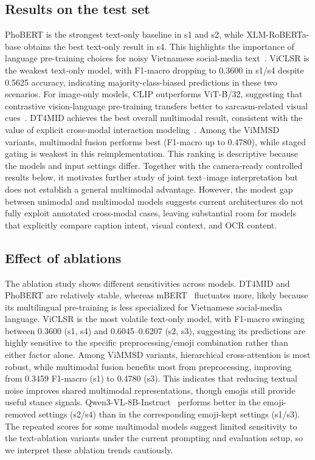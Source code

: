 \documentclass[conference]{IEEEtran}
\begin{document}
\subsection{Results on the test set}
PhoBERT is the strongest text-only baseline in s1 and s2, while XLM-RoBERTa-base obtains the best text-only result in s4. This highlights the importance of language pre-training choices for noisy Vietnamese social-media text~\cite{nguyen-tuan-nguyen-2020-phobert}. ViCLSR is the weakest text-only model, with F1-macro dropping to 0.3600 in s1/s4 despite 0.5625 accuracy, indicating majority-class-biased predictions in these two scenarios. For image-only models, CLIP outperforms ViT-B/32, suggesting that contrastive vision-language pre-training transfers better to sarcasm-related visual cues~\cite{radford_learning_2021}. DT4MID achieves the best overall multimodal result, consistent with the value of explicit cross-modal interaction modeling~\cite{tomas_transformer-based_2023}.
Among the ViMMSD variants, multimodal fusion performs best (F1-macro up to 0.4780), while staged gating is weakest in this reimplementation. This ranking is descriptive because the models and input settings differ. Together with the camera-ready controlled results below, it motivates further study of joint text--image interpretation but does not establish a general multimodal advantage.
However, the modest gap between unimodal and multimodal models suggests current architectures do not fully exploit annotated cross-modal cases, leaving substantial room for models that explicitly compare caption intent, visual context, and OCR content.
\subsection{Effect of ablations}
\label{sec:text-ablation}
The ablation study shows different sensitivities across models. DT4MID and PhoBERT are relatively stable, whereas mBERT~\cite{pires_how_2019} fluctuates more, likely because its multilingual pre-training is less specialized for Vietnamese social-media language. ViCLSR is the most volatile text-only model, with F1-macro swinging between 0.3600 (s1, s4) and 0.6045--0.6207 (s2, s3), suggesting its predictions are highly sensitive to the specific preprocessing/emoji combination rather than either factor alone. Among ViMMSD variants, hierarchical cross-attention is most robust, while multimodal fusion benefits most from preprocessing, improving from 0.3459 F1-macro (s1) to 0.4780 (s3). This indicates that reducing textual noise improves shared multimodal representations, though emojis still provide useful stance signals. Qwen3-VL-8B-Instruct~\cite{bai_qwen3-vl_2025} performs better in the emoji-removed settings (s2/s4) than in the corresponding emoji-kept settings (s1/s3). The repeated scores for some multimodal models suggest limited sensitivity to the text-ablation variants under the current prompting and evaluation setup, so we interpret these ablation trends cautiously.
\end{document}
